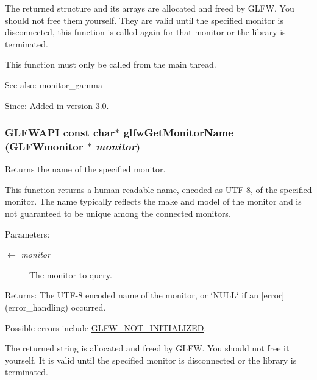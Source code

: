 The returned structure and its arrays are allocated and freed by GLFW. You should not free them yourself. They are valid until the specified monitor is disconnected, this function is called again for that monitor or the library is terminated.

This function must only be called from the main thread.

\begin{Desc}
\item[See also:]monitor\_\-gamma\end{Desc}
\begin{Desc}
\item[Since:]Added in version 3.0. \end{Desc}
\hypertarget{group__monitor_g22f62011bae33ea8d2974eff5d14f9b8}{
\subsubsection[glfwGetMonitorName]{\setlength{\rightskip}{0pt plus 5cm}GLFWAPI const char$\ast$ glfwGetMonitorName ({\bf GLFWmonitor} $\ast$ {\em monitor})}}
\label{group__monitor_g22f62011bae33ea8d2974eff5d14f9b8}


Returns the name of the specified monitor. 

This function returns a human-readable name, encoded as UTF-8, of the specified monitor. The name typically reflects the make and model of the monitor and is not guaranteed to be unique among the connected monitors.

\begin{Desc}
\item[Parameters:]
\begin{description}
\item[\mbox{$\leftarrow$} {\em monitor}]The monitor to query. \end{description}
\end{Desc}
\begin{Desc}
\item[Returns:]The UTF-8 encoded name of the monitor, or `NULL` if an \mbox{[}error\mbox{]}(error\_\-handling) occurred.\end{Desc}
Possible errors include \hyperlink{group__errors_g2374ee02c177f12e1fa76ff3ed15e14a}{GLFW\_\-NOT\_\-INITIALIZED}.

The returned string is allocated and freed by GLFW. You should not free it yourself. It is valid until the specified monitor is disconnected or the library is terminated.

